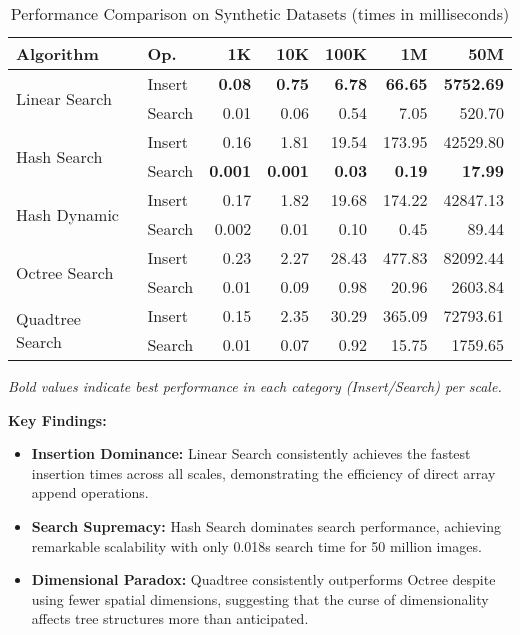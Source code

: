 \documentclass{sbc2023}
\begin{document}
\begin{table}[H]
    \footnotesize 
    \centering
    \caption{Performance Comparison on Synthetic Datasets (times in milliseconds)} 
    \label{tab:synthetic_performance_ms}
    \setlength{\tabcolsep}{3pt} 
    \begin{tabular}{ll rrrrr} 
        \toprule
        \textbf{Algorithm} & \textbf{Op.} & \textbf{1K} & \textbf{10K} & \textbf{100K} & \textbf{1M} & \textbf{50M} \\
        \midrule
        \multirow{2}{*}{Linear Search} & Insert & \textbf{0.08} & \textbf{0.75} & \textbf{6.78} & \textbf{66.65} & \textbf{5752.69} \\
        & Search & 0.01 & 0.06 & 0.54 & 7.05 & 520.70 \\
        \cmidrule(lr){2-7}
        \multirow{2}{*}{Hash Search} & Insert & 0.16 & 1.81 & 19.54 & 173.95 & 42529.80 \\
        & Search & \textbf{0.001} & \textbf{0.001} & \textbf{0.03} & \textbf{0.19} & \textbf{17.99} \\
        \cmidrule(lr){2-7}
        \multirow{2}{*}{Hash Dynamic} & Insert & 0.17 & 1.82 & 19.68 & 174.22 & 42847.13 \\
        & Search & 0.002 & 0.01 & 0.10 & 0.45 & 89.44 \\
        \cmidrule(lr){2-7}
        \multirow{2}{*}{Octree Search} & Insert & 0.23 & 2.27 & 28.43 & 477.83 & 82092.44 \\
        & Search & 0.01 & 0.09 & 0.98 & 20.96 & 2603.84 \\
        \cmidrule(lr){2-7}
        \multirow{2}{*}{Quadtree Search} & Insert & 0.15 & 2.35 & 30.29 & 365.09 & 72793.61 \\
        & Search & 0.01 & 0.07 & 0.92 & 15.75 & 1759.65 \\
        \bottomrule
    \end{tabular}
    \vspace{0.2cm}
    \begin{minipage}{\columnwidth}
    \footnotesize
    \textit{Bold values indicate best performance in each category (Insert/Search) per scale.}
    \end{minipage}
\end{table}

\textbf{Key Findings:}

\begin{itemize}
    \item \textbf{Insertion Dominance:} Linear Search consistently achieves the fastest insertion times across all scales, demonstrating the efficiency of direct array append operations.
    \item \textbf{Search Supremacy:} Hash Search dominates search performance, achieving remarkable scalability with only 0.018s search time for 50 million images.
    \item \textbf{Dimensional Paradox:} Quadtree consistently outperforms Octree despite using fewer spatial dimensions, suggesting that the curse of dimensionality affects tree structures more than anticipated.
\end{itemize}
\end{document}
